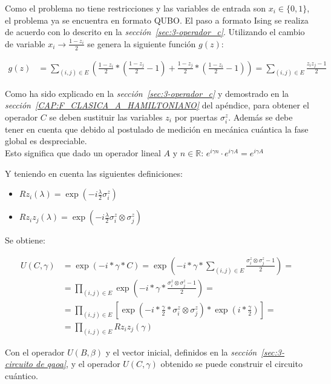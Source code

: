 Como el problema no tiene restricciones y las variables de entrada son $x_i \in \{0, 1\}$, el problema ya se encuentra en formato QUBO\@.
El paso a formato Ising se realiza de acuerdo con lo descrito en la \textit{sección~\ref{sec:3-operador_c}}.
Utilizando el cambio de variable $x_i \rightarrow \frac{1 - z_i}{2}$ se genera la siguiente función $g(z)$:

\begin{align}
  g(z) &= \sum_{(i, j) \in E} (\frac{1 - z_i}{2} * (\frac{1 - z_j}{2} - 1) + \frac{1 - z_j}{2} * (\frac{1 - z_i}{2} - 1)) = \sum_{(i, j) \in E} \frac{z_i z_j - 1}{2}
\end{align}

Como ha sido explicado en la \textit{sección~\ref{sec:3-operador_c}} y demostrado en la \textit{sección~\ref{CAP:F_CLASICA_A_HAMILTONIANO}} del apéndice, para obtener el operador $C$ se deben sustituir las variables $z_i$ por puertas $\sigma^z_i$.
Además se debe tener en cuenta que debido al postulado de medición en mecánica cuántica\cite{Nielsen_Chuang_2010} la fase global es despreciable.
\\
Esto significa que dado un operador lineal $A$ y $n \in \mathbb{R}$: $e^{i \gamma n} \cdot e^{i \gamma A} = e^{i \gamma A}$

Y teniendo en cuenta las siguientes definiciones:
\begin{itemize}
\item $ Rz_i(\lambda) = \exp(-i\frac{\lambda}{2}\sigma_i^z) $
\item $ Rz_i z_j(\lambda) = \exp(-i\frac{\lambda}{2}\sigma_i^z \otimes \sigma_j^z) $
\end{itemize}

Se obtiene:

\begin{align}
  U(C, \gamma) &=  \exp(-i*\gamma*C) = \exp(-i*\gamma* \sum_{(i, j) \in E} \frac{\sigma_i^z \otimes \sigma_j^z - 1}{2}) = \nonumber \\
          &= \prod_{(i, j) \in E} \exp(-i*\gamma* \frac{\sigma_i^z \otimes \sigma_j^z - 1}{2}) = \nonumber \\
          &= \prod_{(i, j) \in E} [ \exp(-i*\frac{\gamma}{2}* \sigma_i^z \otimes \sigma_j^z) * \exp(i*\frac{\gamma}{2}) ] = \nonumber \\
          &= \prod_{(i, j) \in E} Rz_i z_j(\gamma)
\end{align}

Con el operador \(U(B, \beta)\) y el vector inicial, definidos en la \textit{sección~\ref{sec:3-circuito de qaoa}}, y el operador \(U(C, \gamma)\) obtenido se puede construir el circuito cuántico.

